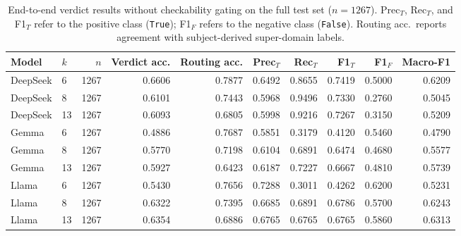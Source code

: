 \begin{table}[h]
\centering
\caption[End-to-end verdict results without checkability gating on the full test set ($n=1267$).]{End-to-end verdict results without checkability gating on the full test set ($n=1267$). Prec$_T$, Rec$_T$, and F1$_T$ refer to the positive class (\texttt{True}); F1$_F$ refers to the negative class (\texttt{False}). Routing acc.\ reports agreement with subject-derived super-domain labels.}
\label{tab:appendix_e2e_no_gate}
\small
\begin{tabular}{llrrrrrrrr}
\hline
Model & $k$ & $n$ & Verdict acc. & Routing acc. & Prec$_T$ & Rec$_T$ & F1$_T$ & F1$_F$ & Macro-F1 \\
\hline
DeepSeek & 6  & 1267 & 0.6606 & 0.7877 & 0.6492 & 0.8655 & 0.7419 & 0.5000 & 0.6209 \\
DeepSeek & 8  & 1267 & 0.6101 & 0.7443 & 0.5968 & 0.9496 & 0.7330 & 0.2760 & 0.5045 \\
DeepSeek & 13 & 1267 & 0.6093 & 0.6805 & 0.5998 & 0.9216 & 0.7267 & 0.3150 & 0.5209 \\
\hline
Gemma    & 6  & 1267 & 0.4886 & 0.7687 & 0.5851 & 0.3179 & 0.4120 & 0.5460 & 0.4790 \\
Gemma    & 8  & 1267 & 0.5770 & 0.7198 & 0.6104 & 0.6891 & 0.6474 & 0.4680 & 0.5577 \\
Gemma    & 13 & 1267 & 0.5927 & 0.6423 & 0.6187 & 0.7227 & 0.6667 & 0.4810 & 0.5739 \\
\hline
Llama    & 6  & 1267 & 0.5430 & 0.7656 & 0.7288 & 0.3011 & 0.4262 & 0.6200 & 0.5231 \\
Llama    & 8  & 1267 & 0.6322 & 0.7395 & 0.6685 & 0.6891 & 0.6786 & 0.5700 & 0.6243 \\
Llama    & 13 & 1267 & 0.6354 & 0.6886 & 0.6765 & 0.6765 & 0.6765 & 0.5860 & 0.6313 \\
\hline
\end{tabular}
\normalsize
\end{table}


